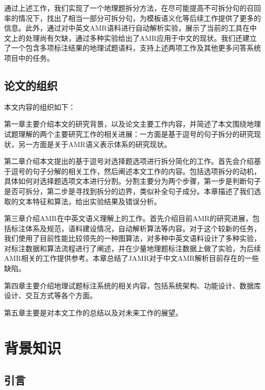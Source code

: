 \documentclass[master, winfont]{njuthesis}
\begin{document}
通过上述工作，我们实现了一个地理题拆分方法，在尽可能提高不可拆分句的召回率的情况下，找出了相当一部分可拆分句，为模板语义化等后续工作提供了更多的信息。此外，通过对中英文AMR语料进行自动解析实验，展示了当前的工具在中文上的处理尚有欠缺，通过多种实验给出了AMR应用于中文的现状。我们还建立了一个包含多项标注结果的地理试题语料，支持上述两项工作及其他更多问答系统项目中的任务。

\section{论文的组织}
本文内容的组织如下：

第一章主要介绍本文的研究背景，以及论文主要工作内容，并简述了本文围绕地理试题理解的两个主要研究工作的相关进展：一方面是基于逗号的句子拆分的研究现状，另一方面是关于AMR语义表示体系的研究现状。

第二章介绍本文提出的基于逗号对选择题选项进行拆分简化的工作。首先会介绍基于逗号的句子分解的相关工作，然后阐述本文工作的内容。包括选项拆分的动机，具体如何对选择题选项文本进行分割。分割主要分为两个步骤，第一步是判断句子是否可拆分，第二步是寻找到拆分的边界，类似补全句子成分。本章描述了我们选取的文本特征和算法，给出实验结果及错误分析。

第三章介绍AMR在中英文语义理解上的工作。首先介绍目前AMR的研究进展，包括标注体系及规范，语料建设情况，自动解析算法等内容。对于这个较新的任务，我们使用了目前性能比较领先的一种图算法，对多种中英文语料设计了多种实验，对标注数据和算法流程进行了阐述，并在少量地理题标注数据上做了实验，为后续AMR相关的工作提供参考。本章总结了JAMR对于中文AMR解析目前存在的一些缺陷。

第四章主要介绍地理试题标注系统的相关内容，包括系统架构、功能设计、数据库设计、交互方式等各个方面。

第五章主要是对本文工作的总结以及对未来工作的展望。

\chapter{背景知识}
\section{引言}
\end{document}
